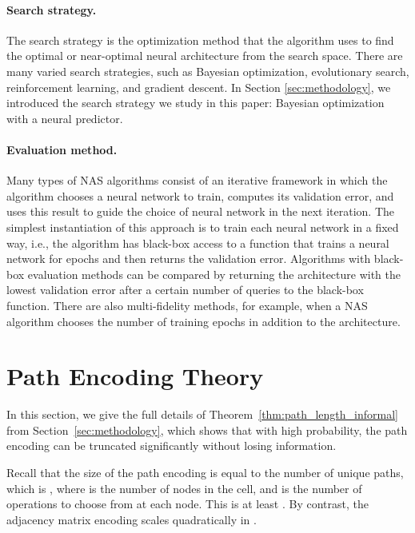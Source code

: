 \documentclass[11pt]{article}
\numberwithin{equation}{section}
\numberwithin{figure}{section}
\theoremstyle{plain}
\theoremstyle{definition}
\begin{document}
\paragraph{Search strategy.}
The search strategy is the optimization method that the algorithm uses to find the optimal or near-optimal neural architecture from the search space.
There are many varied search strategies, such as Bayesian optimization, evolutionary search, reinforcement learning, and gradient descent. 
In Section \ref{sec:methodology}, we introduced the search strategy we study in this
paper: Bayesian optimization with a neural predictor.

\paragraph{Evaluation method.}
Many types of NAS algorithms consist of an iterative framework in which the algorithm
chooses a neural network to train, computes its validation error, and uses this result
to guide the choice of neural network in the next iteration. The simplest instantiation
of this approach is to train each neural network in a fixed way, i.e., the algorithm
has black-box access to a function that trains a neural network for  epochs and then
returns the validation error.
Algorithms with black-box
evaluation methods can be compared by returning the architecture with the lowest 
validation error after a certain number of queries to the black-box function. There
are also multi-fidelity methods, for example, when a NAS algorithm chooses the number of
training epochs in addition to the architecture.

 \section{Path Encoding Theory}\label{app:methodology}

In this section, we give the full details of Theorem~\ref{thm:path_length_informal}
from Section~\ref{sec:methodology}, which shows that with high probability, 
the path encoding can be truncated significantly without losing information.

Recall that the size of the path encoding is equal to the
number of unique paths, which is , where
 is the number of nodes in the cell, and  is the
number of operations to choose from at each node.
This is at least .
By contrast, the adjacency matrix encoding scales quadratically
in .
\end{document}
